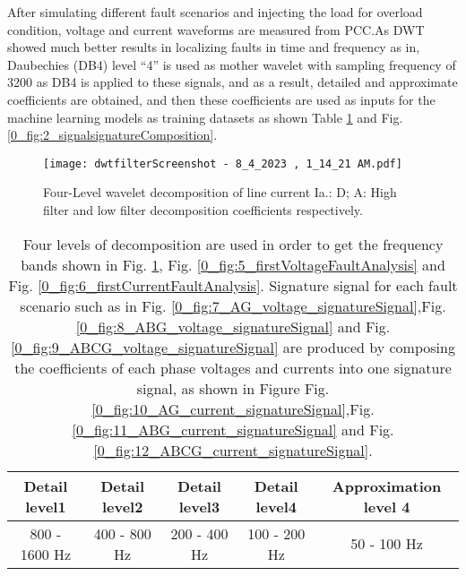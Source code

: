 \documentclass[8pt,a4paper,oneside]{elsarticle}
\begin{document}
After simulating different fault scenarios and injecting the load for overload condition, voltage and current waveforms are measured from PCC.As DWT showed much better results in localizing faults in time and frequency as in\cite{10.1109/poweri.2006.1632580_19}, Daubechies (DB4) level “4” is used as mother wavelet with sampling frequency of 3200 as DB4 is applied to these signals, and as a result, detailed and approximate coefficients are obtained, and then these coefficients are used as inputs for the machine learning models as training datasets
as shown Table \ref{0_table1} and Fig. \ref{0_fig:2_signalsignatureComposition}.  
\begin{figure}[H]
    \centering
    \texttt{[image: dwtfilterScreenshot - 8\_4\_2023 , 1\_14\_21 AM.pdf]}
    \caption{Four-Level wavelet decomposition of line current Ia.: D; A: High
filter and low filter decomposition coefficients respectively.}
    \label{0_fig:1_wavelet}
\end{figure}
\begin{table}[ht]
\centering
\caption{Four levels of decomposition are used in order to get the
frequency bands shown in Fig. \ref{0_fig:1_wavelet}, Fig. \ref{0_fig:5_firstVoltageFaultAnalysis} and Fig. \ref{0_fig:6_firstCurrentFaultAnalysis}. Signature
signal for each fault scenario such as in Fig. \ref{0_fig:7_AG_voltage_signatureSignal},Fig. \ref{0_fig:8_ABG_voltage_signatureSignal} and Fig. \ref{0_fig:9_ABCG_voltage_signatureSignal}
are produced by composing the coefficients of each phase
voltages and currents into one signature signal, as shown in
Figure Fig. \ref{0_fig:10_AG_current_signatureSignal},Fig. \ref{0_fig:11_ABG_current_signatureSignal} and Fig. \ref{0_fig:12_ABCG_current_signatureSignal}.}
\begin{tabular}{|c|c|c|c|c|}
\hline
Detail level1 & Detail level2 & Detail level3 & Detail level4 & Approximation level 4\\
\hline
800 - 1600 Hz& 400 - 800 Hz & 200 - 400 Hz& 100 - 200 Hz & 50 - 100 Hz\\

\hline
\end{tabular}
\label{0_table1}
\end{table}
\end{document}
